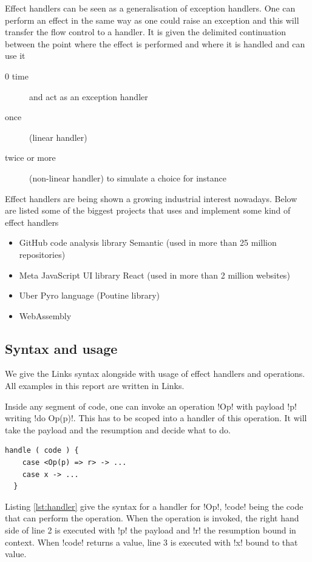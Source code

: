 \documentclass[11pt, nonacm=true, language=french, language=english]{acmart}
\begin{document}
Effect handlers can be seen as a generalisation of exception handlers. One can perform an effect in the same way as one could raise an exception and this will transfer the flow control to a handler. It is given the delimited continuation between the point where the effect is performed and where it is handled and can use it
\begin{description}
  \item[0 time] and act as an exception handler
  \item[once] (linear handler)
  \item[twice or more] (non-linear handler) to simulate a choice for instance
\end{description}

Effect handlers are being shown a growing industrial interest nowadays. Below are listed some of the biggest projects that uses and implement some kind of effect handlers
\begin{itemize}
  \item GitHub code analysis library Semantic (used in more than 25 million repositories)
  \item Meta JavaScript UI library React (used in more than 2 million websites)
  \item Uber Pyro language (Poutine library) \cite{pyro, pyro-poutine}
  \item WebAssembly \cite{wasmfx}
\end{itemize}

\subsection{Syntax and usage}

We give the Links syntax alongside with usage of effect handlers and operations. All examples in this report are written in Links.

Inside any segment of code, one can invoke an operation !Op! with payload !p! writing !do Op(p)!. This has to be scoped into a handler of this operation. It will take the payload and the resumption and decide what to do.

\begin{lstlisting}[caption=Handler,label=lst:handler]
  handle ( code ) {
    case <Op(p) => r> -> ...
    case x -> ...
  }
\end{lstlisting}

Listing \ref{lst:handler} give the syntax for a handler for !Op!, !code! being the code that can perform the operation. When the operation is invoked, the right hand side of line 2 is executed with !p! the payload and !r! the resumption bound in context. When !code! returns a value, line 3 is executed with !x! bound to that value.
\end{document}
